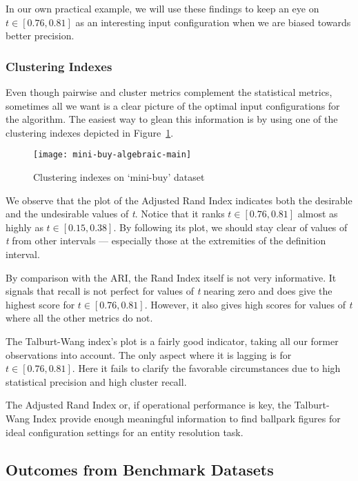 In our own practical example, we will use these findings to keep an eye on
$t\in\left[0.76,0.81\right]$ as an interesting input configuration when we are
biased towards better precision.

\subsubsection{Clustering Indexes}

Even though pairwise and cluster metrics complement the statistical metrics,
sometimes all we want is a clear picture of the optimal input configurations for
the algorithm.
The easiest way to glean this information is by using one of the clustering
indexes depicted in Figure~\ref{fig:mini-alg}.

\begin{figure}[!h]
    \centering
    \captionsetup{justification=centering}
    \texttt{[image: mini-buy-algebraic-main]}
    \caption{Clustering indexes on `mini-buy' dataset}
    \label{fig:mini-alg}
\end{figure}

We observe that the plot of the Adjusted Rand Index indicates both the desirable
and the undesirable values of \textit{t}.
Notice that it ranks $t\in\left[0.76,0.81\right]$ almost as highly as
$t\in\left[0.15,0.38\right]$.
By following its plot, we should stay clear of values of \textit{t} from other
intervals --- especially those at the extremities of the definition interval.

By comparison with the ARI, the Rand Index itself is not very informative.
It signals that recall is not perfect for values of \textit{t} nearing zero and
does give the highest score for $t\in\left[0.76,0.81\right]$.
However, it also gives high scores for values of \textit{t} where all the other
metrics do not.

The Talburt-Wang index's plot is a fairly good indicator, taking all our former
observations into account.
The only aspect where it is lagging is for $t\in\left[0.76,0.81\right]$.
Here it fails to clarify the favorable circumstances due to high statistical
precision and high cluster recall.

The Adjusted Rand Index or, if operational performance is key, the Talburt-Wang
Index provide enough meaningful information to find ballpark figures for ideal
configuration settings for an entity resolution task.

\subsection{Outcomes from Benchmark Datasets}\label{subsec:experiment-benchmark}

